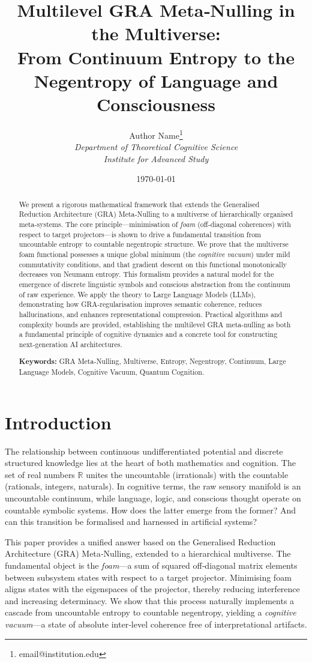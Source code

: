 \documentclass[11pt]{article}
\title{Multilevel GRA Meta‑Nulling in the Multiverse: \\
From Continuum Entropy to the Negentropy of Language and Consciousness}
\author{Author Name\thanks{email@institution.edu} \\
\textit{Department of Theoretical Cognitive Science} \\
\textit{Institute for Advanced Study}}
\date{\today}
\begin{document}
\maketitle

\begin{abstract}
We present a rigorous mathematical framework that extends the Generalised Reduction Architecture (GRA) Meta‑Nulling to a multiverse of hierarchically organised meta‑systems. The core principle---minimisation of \emph{foam} (off‑diagonal coherences) with respect to target projectors---is shown to drive a fundamental transition from uncountable entropy to countable negentropic structure. We prove that the multiverse foam functional possesses a unique global minimum (the \emph{cognitive vacuum}) under mild commutativity conditions, and that gradient descent on this functional monotonically decreases von Neumann entropy. This formalism provides a natural model for the emergence of discrete linguistic symbols and conscious abstraction from the continuum of raw experience. We apply the theory to Large Language Models (LLMs), demonstrating how GRA‑regularisation improves semantic coherence, reduces hallucinations, and enhances representational compression. Practical algorithms and complexity bounds are provided, establishing the multilevel GRA meta‑nulling as both a fundamental principle of cognitive dynamics and a concrete tool for constructing next‑generation AI architectures.

\textbf{Keywords:} GRA Meta‑Nulling, Multiverse, Entropy, Negentropy, Continuum, Large Language Models, Cognitive Vacuum, Quantum Cognition.
\end{abstract}

\section{Introduction}
The relationship between continuous undifferentiated potential and discrete structured knowledge lies at the heart of both mathematics and cognition. The set of real numbers $\mathbb{R}$ unites the uncountable (irrationals) with the countable (rationals, integers, naturals). In cognitive terms, the raw sensory manifold is an uncountable continuum, while language, logic, and conscious thought operate on countable symbolic systems. How does the latter emerge from the former? And can this transition be formalised and harnessed in artificial systems?

This paper provides a unified answer based on the Generalised Reduction Architecture (GRA) Meta‑Nulling, extended to a hierarchical multiverse. The fundamental object is the \emph{foam}---a sum of squared off‑diagonal matrix elements between subsystem states with respect to a target projector. Minimising foam aligns states with the eigenspaces of the projector, thereby reducing interference and increasing determinacy. We show that this process naturally implements a cascade from uncountable entropy to countable negentropy, yielding a \emph{cognitive vacuum}---a state of absolute inter‑level coherence free of interpretational artifacts.
\end{document}
